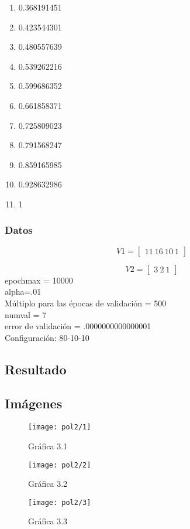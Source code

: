 \documentclass[6pt]{article}
\begin{document}
\begin{multicols}{4}
\begin{enumerate}
		\item 0.368191451
		\item 0.423544301
		\item 0.480557639
		\item 0.539262216
		\item 0.599686352
		\item 0.661858371
		\item 0.725809023
		\item 0.791568247
		\item 0.859165985
		\item 0.928632986
		\item 1
	\end{enumerate}
\end{multicols}
\subsubsection{Datos}
\[V1=
\begin{bmatrix}
11\ 16\ 10\ 1
\end{bmatrix}\]

\[V2=
\begin{bmatrix}
3\ 2\ 1
\end{bmatrix}\]
epochmax = 10000\\
alpha=.01\\
Múltiplo para las épocas de validación = 500\\
numval = 7\\
error de validación = .0000000000000001\\
Configuración: 80-10-10
\subsection{Resultado}
\subsection{Imágenes}
\begin{figure}[htpb]
	\centering
	\texttt{[image: pol2/1]}
	\caption{Gráfica 3.1}
\end{figure}

\begin{figure}[htpb]
	\centering
	\texttt{[image: pol2/2]}
	\caption{Gráfica 3.2}
\end{figure}

\begin{figure}[htpb]
	\centering
	\texttt{[image: pol2/3]}
	\caption{Gráfica 3.3}
\end{figure}
\end{document}
